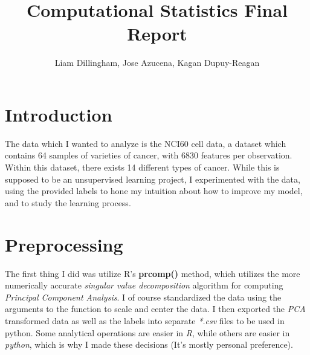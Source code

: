 \documentclass[20pt]{article} %
\title{Computational Statistics Final Report}
\author{Liam Dillingham, Jose Azucena, Kagan Dupuy-Reagan}
\begin{document}
\maketitle

\section{Introduction}
The data which I wanted to analyze is the NCI60 cell data, a dataset which contains 64 samples of varieties of cancer, with 6830 features per observation.  Within this dataset, there exists 14 different types of cancer.  While this is supposed to  be an unsupervised learning project, I experimented with the data, using the provided labels to hone my intuition about how to improve my model, and to study the learning process.

\section{Preprocessing}
The first thing I did was utilize R's \textbf{prcomp()} method, which utilizes the more numerically accurate \textit{singular value decomposition} algorithm for computing \textit{Principal Component Analysis}.  I of course standardized the data using the arguments to the function to scale and center the data.  I then exported the \textit{PCA} transformed data as well as the labels into separate \textit{*.csv} files to be used in python.  Some analytical operations are easier in \textit{R}, while others are easier in \textit{python}, which is why I made these decisions (It's mostly personal preference).
\end{document}
